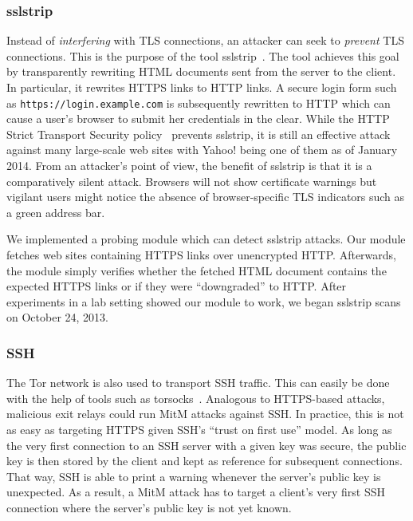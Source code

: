 \documentclass[letterpaper,twocolumn,10pt]{article}
\begin{document}
\subsubsection{sslstrip}
Instead of \emph{interfering} with TLS connections, an attacker can seek to \emph{prevent} TLS
connections.  This is the purpose of the tool \textsf{sslstrip}~\cite{sslstrip}.  The tool achieves
this goal by transparently rewriting HTML documents sent from the server to the client.  In
particular, it rewrites HTTPS links to HTTP links.  A secure login form such as
\texttt{https://login.example.com} is subsequently rewritten to HTTP which can cause a user's
browser to submit her credentials in the clear.  While the HTTP Strict Transport Security
policy~\cite{rfc6797} prevents sslstrip, it is still an effective attack against many large-scale
web sites with Yahoo! being one of them as of January 2014.  From an attacker's point of view, the
benefit of \textsf{sslstrip} is that it is a comparatively silent attack.  Browsers will not show
certificate warnings but vigilant users might notice the absence of browser-specific TLS
indicators such as a green address bar.

We implemented a probing module which can detect \textsf{sslstrip} attacks.  Our module fetches web
sites containing HTTPS links over unencrypted HTTP.  Afterwards, the module simply verifies whether
the fetched HTML document contains the expected HTTPS links or if they were ``downgraded'' to HTTP.
After experiments in a lab setting showed our module to work, we began \textsf{sslstrip} scans on
October 24, 2013.

\subsubsection{SSH}



The Tor network is also used to transport SSH traffic.  This can easily be done with the help of
tools such as \textsf{torsocks}~\cite{torsocks}.  Analogous to HTTPS-based attacks, malicious exit
relays could run MitM attacks against SSH.  In practice, this is not as easy as targeting HTTPS
given SSH's ``trust on first use'' model.  As long as the very first connection to an SSH server
with a given key was secure, the public key is then stored by the client and kept as reference for
subsequent connections.  That way, SSH is able to print a warning whenever the server's public key
is unexpected.  As a result, a MitM attack has to target a client's very first SSH connection where
the server's public key is not yet known.
\end{document}
